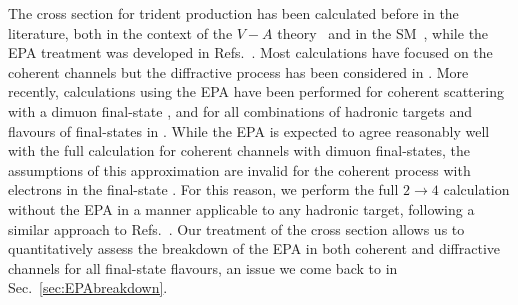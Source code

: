 The cross section for trident production has been calculated before in the literature, both in the context of the $V-A$ theory~\cite{Czyz:1964zz,Lovseth:1971vv,Fujikawa:1971nx} and in the SM~\cite{Brown:1973ih}, while the EPA treatment was developed in Refs.~\cite{Kozhushner:1962aa,Shabalin:1963aa,Belusevic:1987cw}. Most calculations have focused on the coherent channels \cite{Czyz:1964zz,Lovseth:1971vv,Fujikawa:1971nx,Brown:1973ih,Belusevic:1987cw} but the diffractive process has been considered in \cite{Czyz:1964zz,Lovseth:1971vv}. More recently, calculations using the EPA have been performed for coherent scattering with a dimuon final-state \cite{Altmannshofer:2014pba}, and for all combinations of hadronic targets and flavours of final-states in \cite{Magill:2016hgc}. While the EPA is expected to agree reasonably well with the full calculation for coherent channels with dimuon final-states, the assumptions of this approximation are invalid for the coherent process with electrons in the final-state \cite{Kozhushner:1962aa,Shabalin:1963aa,Czyz:1964zz}. 
%
For this reason, we perform the full $2\to 4$ calculation without the EPA in a manner applicable to any hadronic target, following a similar approach to Refs.~\cite{Czyz:1964zz,Lovseth:1971vv}. Our treatment of the cross section allows us to quantitatively assess the breakdown of the EPA in both coherent and diffractive channels for all final-state flavours, an issue we come back to in Sec.~\ref{sec:EPAbreakdown}.

